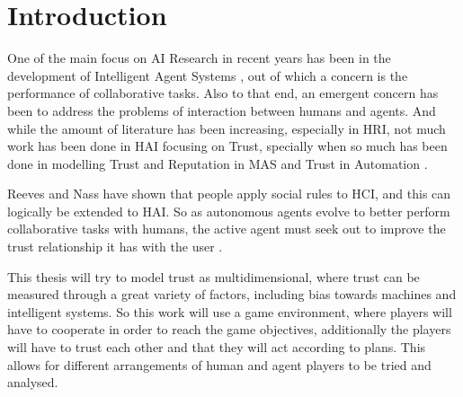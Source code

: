 \section{Introduction}
\label{sec:Introduction}

One of the main focus on \ac{AI} Research in recent years has been in the development of Intelligent Agent Systems \cite{Russell2009a}, out of which a concern is the performance of collaborative tasks\cite{Grosz1996, Allen2002, Allen2007}. Also to that end, an emergent concern has been to address the problems of interaction between humans and agents\cite{Bradshaw2011}. And while the amount of literature has been increasing, especially in \ac{HRI}\cite{Goodrich2007}, not much work has been done in \ac{HAI} focusing on Trust, specially when so much has been done in modelling Trust and Reputation in \ac{MAS}\cite{Granatyr2015} and Trust in Automation \cite{Lee1992, Jones1997, Lee2004}.

Reeves and Nass have shown that people apply social rules to \ac{HCI}, and this can logically be extended to \ac{HAI}\cite{Reeves1998a}. So as autonomous agents evolve to better perform collaborative tasks with humans, the active agent must seek out to improve the trust relationship it has with the user \cite{Lashkari1994}. 


This thesis will try to model trust as multidimensional, where trust can be measured through a great variety of factors, including bias towards machines and intelligent systems. So this work will use a game environment, where players will have to cooperate in order to reach the game objectives, additionally the players will have to trust each other and that they will act according to plans. This allows for different arrangements of human and agent players to be tried and analysed.




